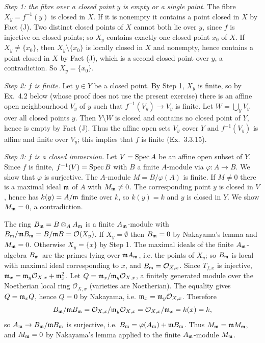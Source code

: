 \documentclass[11pt]{article}
\begin{document}
\emph{Step 1: the fibre over a closed point $y$ is empty or a single point.} The fibre $X_y=f^{-1}(y)$ is closed in $X$. If it is nonempty it contains a point closed in $X$ by Fact (J). Two distinct closed points of $X$ cannot both lie over $y$, since $f$ is injective on closed points; so $X_y$ contains exactly one closed point $x_0$ of $X$. If $X_y\neq\{x_0\}$, then $X_y\setminus\{x_0\}$ is locally closed in $X$ and nonempty, hence contains a point closed in $X$ by Fact (J), which is a second closed point over $y$, a contradiction. So $X_y=\{x_0\}$.

\emph{Step 2: $f$ is finite.} Let $y\in Y$ be a closed point. By Step 1, $X_y$ is finite, so by Ex.~4.2 below (whose proof does not use the present exercise) there is an affine open neighbourhood $V_y$ of $y$ such that $f^{-1}(V_y)\to V_y$ is finite. Let $W=\bigcup_yV_y$ over all closed points $y$. Then $Y\setminus W$ is closed and contains no closed point of $Y$, hence is empty by Fact (J). Thus the affine open sets $V_y$ cover $Y$ and $f^{-1}(V_y)$ is affine and finite over $V_y$; this implies that $f$ is finite (Ex.~3.3.15).

\emph{Step 3: $f$ is a closed immersion.} Let $V=\operatorname{Spec} A$ be an affine open subset of $Y$. Since $f$ is finite, $f^{-1}(V)=\operatorname{Spec} B$ with $B$ a finite $A$-module via $\varphi:A\to B$. We show that $\varphi$ is surjective. The $A$-module $M=B/\varphi(A)$ is finite. If $M\neq0$ there is a maximal ideal $\mathfrak m$ of $A$ with $M_{\mathfrak m}\neq0$. The corresponding point $y$ is closed in $V$, hence has $k(y)=A/\mathfrak m$ finite over $k$, so $k(y)=k$ and $y$ is closed in $Y$. We show $M_\mathfrak m=0$, a contradiction.

The ring $B_\mathfrak m=B\otimes_AA_\mathfrak m$ is a finite $A_\mathfrak m$-module with $B_\mathfrak m/\mathfrak m B_\mathfrak m=B/\mathfrak m B=\mathcal O(X_y)$. If $X_y=\emptyset$ then $B_\mathfrak m=0$ by Nakayama's lemma and $M_\mathfrak m=0$. Otherwise $X_y=\{x\}$ by Step 1. The maximal ideals of the finite $A_\mathfrak m$-algebra $B_\mathfrak m$ are the primes lying over $\mathfrak m A_\mathfrak m$, i.e. the points of $X_y$; so $B_\mathfrak m$ is local with maximal ideal corresponding to $x$, and $B_\mathfrak m=\mathcal O_{X,x}$. Since $T_{f,x}$ is injective, $\mathfrak m_x=\mathfrak m_y\mathcal O_{X,x}+\mathfrak m_x^2$. Let $Q=\mathfrak m_x/\mathfrak m_y\mathcal O_{X,x}$, a finitely generated module over the Noetherian local ring $\mathcal O_{X,x}$ (varieties are Noetherian). The equality gives $Q=\mathfrak m_xQ$, hence $Q=0$ by Nakayama, i.e. $\mathfrak m_x=\mathfrak m_y\mathcal O_{X,x}$. Therefore
\[ B_\mathfrak m/\mathfrak m B_\mathfrak m=\mathcal O_{X,x}/\mathfrak m_y\mathcal O_{X,x}=\mathcal O_{X,x}/\mathfrak m_x=k(x)=k, \]
so $A_\mathfrak m\to B_\mathfrak m/\mathfrak m B_\mathfrak m$ is surjective, i.e. $B_\mathfrak m=\varphi(A_\mathfrak m)+\mathfrak m B_\mathfrak m$. Thus $M_\mathfrak m=\mathfrak m M_\mathfrak m$, and $M_\mathfrak m=0$ by Nakayama's lemma applied to the finite $A_\mathfrak m$-module $M_\mathfrak m$.
\end{document}
